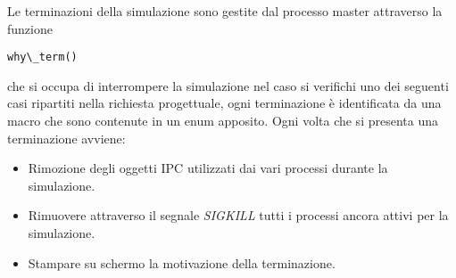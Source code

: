 Le terminazioni della simulazione sono gestite dal processo master attraverso la funzione \begin{lstlisting}why\_term() \end{lstlisting} che si occupa di interrompere la simulazione
nel caso si verifichi uno dei seguenti casi  ripartiti nella richiesta progettuale, ogni terminazione è identificata da una macro che sono contenute in un enum apposito. 
Ogni volta che si presenta una terminazione avviene:
\begin{itemize}
    \item Rimozione degli oggetti IPC utilizzati dai vari processi durante la simulazione. 
    \item Rimuovere attraverso il segnale \textit{SIGKILL} tutti i processi ancora attivi per la simulazione. 
    \item Stampare su schermo la motivazione della terminazione. 
\end{itemize}

